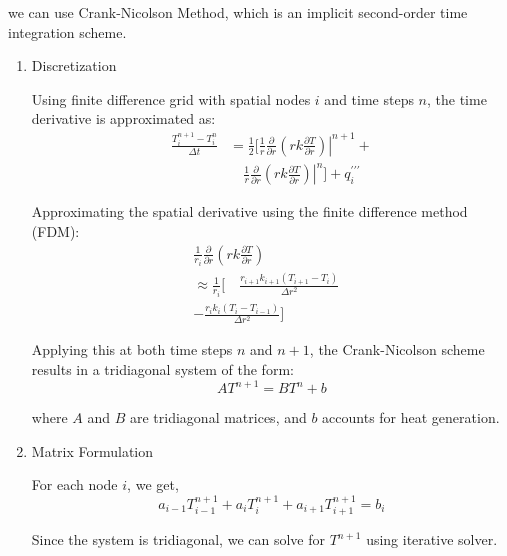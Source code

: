 \documentclass[12pt]{article}
\begin{document}
\begin{multicols}{2}
\begin{enumerate}
    we can use Crank-Nicolson Method, which is an implicit second-order time integration scheme.
    \begin{enumerate}
        \item Discretization

        Using finite difference grid with spatial nodes $\textit{i}$ and time steps $n$, the time derivative is approximated as:
        \begin{equation*}
            \begin{split}
                \frac{T_{i}^{n+1}-T_{i}^{n}}{\Delta t} &= \frac{1}{2} \Bigg[ 
            \left. \frac{1}{r} \frac{\partial}{\partial r} \left( r k \frac{\partial T}{\partial r} \right) \right|^{n+1} + \\  
            &\quad \left. \frac{1}{r} \frac{\partial}{\partial r} \left( r k \frac{\partial T}{\partial r} \right) \right|^{n} 
            \Bigg] + q_{i}^{\prime \prime \prime}
        \end{split}
    \end{equation*}

    Approximating the spatial derivative using the finite difference method (FDM):
    \begin{equation*}
        \begin{split}
            {\frac{1}{r_{i}}}{\frac{\partial}{\partial r}}\left(r k{\frac{\partial T}{\partial r}}\right) 
            & \\ \approx {\frac{1}{r_{i}}} \Bigg[
            \quad {\frac{r_{i+1}k_{i+1}(T_{i+1}-T_{i})}{\Delta r^{2}}} \\
            - {\frac{r_{i}k_{i}(T_{i}-T_{i-1})}{\Delta r^{2}}} \Bigg] 
        \end{split}
    \end{equation*}

    Applying this at both time steps $n$ and $n+1$, the Crank-Nicolson scheme results in a tridiagonal system of the form:
    \[A T^{n+1}=B T^{n}+b\]

    where $A$ and $B$ are tridiagonal matrices, and $b$ accounts for heat generation.

    \item Matrix Formulation

    For each node $i$, we get,
    \[a_{i-1}T_{i-1}^{n+1}+a_{i}T_{i}^{n+1}+a_{i+1}T_{i+1}^{n+1}=b_{i}\]

    Since the system is tridiagonal, we can solve for $T^{n+1}$ using iterative solver.

    \end{enumerate}


\end{enumerate}
\end{multicols}
\end{document}
